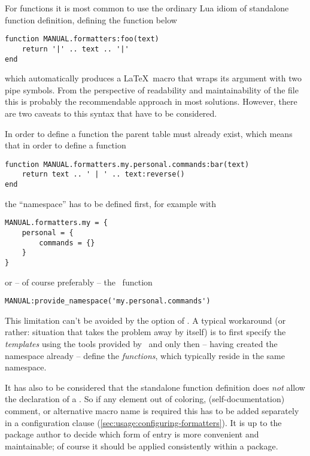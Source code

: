 \documentclass[12pt]{scrartcl}
\begin{document}
For functions it is most common to use the ordinary Lua idiom of standalone function definition, defining the function below 

\begin{verbatim}
function MANUAL.formatters:foo(text)
    return '|' .. text .. '|'
end
\end{verbatim}

\noindent which automatically produces a \LaTeX\ macro
 that wraps its argument 
with two pipe symbols.  From the perspective of readability and maintainability
of the file this is probably the recommendable approach in most solutions.
However, there are two caveats to this syntax that have to be considered.

In order to define a function the parent table must already exist, which means
that in order to define a function

\begin{verbatim}
function MANUAL.formatters.my.personal.commands:bar(text)
    return text .. ' | ' .. text:reverse()
end
\end{verbatim}

\noindent the “namespace”  has to be defined first,
for example with

\begin{verbatim}
MANUAL.formatters.my = {
	personal = {
		commands = {}
	}
}
\end{verbatim}

\noindent or -- of course preferably -- the \luaformatters\ function

\begin{verbatim}
MANUAL:provide_namespace('my.personal.commands')
\end{verbatim}

\noindent This limitation can't be avoided by the  option
of \luaformatters.  A typical workaround (or rather: situation that
takes the problem away by itself) is to first specify the \emph{templates} using
the tools provided by \luaformatters\ and only then -- having created the
namespace already -- define the \emph{functions}, which typically reside in the
same namespace.

\medskip

It has also to be considered that the standalone function definition does \emph{not} allow the declaration of a .  So if any element out of coloring, (self-documentation) comment, or alternative macro name is required this has to be added separately in a configuration clause (\vref{sec:usage:configuring-formatters}).  It is up to the package author to decide which form of entry is more convenient and maintainable; of course it should be applied consistently within a package.
\end{document}

